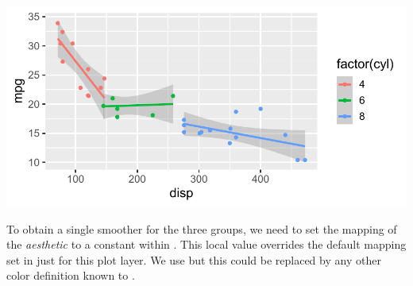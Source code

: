 \documentclass[krantz2]{krantz}\usepackage{knitr}
\begin{document}
\begin{knitrout}\footnotesize
{}\color{fgcolor}\begin{kframe}
\begin{alltt}
\hlstd{(}  \hlstd{(}     \hlstd{=}  \hlopt{+}
  \hlstd{(} \hlstd{=} \hlstd{)} \hlopt{+}
  \hlstd{()}
\end{alltt}
\end{kframe}

{\centering \includegraphics[width=.7\textwidth]{figure/pos-smooth-plot-04-1} 

}



\end{knitrout}

To obtain a single smoother for the three groups, we need to set the mapping of the  \emph{aesthetic} to a constant within . This local value overrides the default  mapping set in  just for this plot layer. We use  but this could be replaced by any other color definition known to \Rlang.

\begin{knitrout}\footnotesize
{}\color{fgcolor}\begin{kframe}
\begin{alltt}
\hlstd{(}  \hlstd{(}     \hlstd{=}  \hlopt{+}
  \hlstd{(} \hlstd{=} \hlstd{,}  \hlstd{=} \hlstd{)} \hlopt{+}
  \hlstd{()}
\end{alltt}
\end{kframe}
\end{knitrout}
\end{document}
